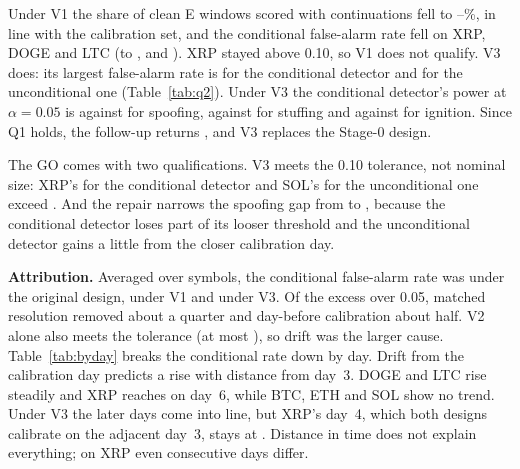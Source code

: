 \documentclass[journal]{IEEEtran}
\begin{document}
Under V1 the share of clean E windows scored with \Mrefine{} continuations fell to
--\%, in line with the calibration set, and the conditional false-alarm rate
fell on XRP, DOGE and LTC (to \faVOneGenXrp, \faVOneGenDoge{} and \faVOneGenLtc). XRP stayed above 0.10, so V1
does not qualify. V3 does: its largest false-alarm rate is \faMaxGenVThree{} for the conditional detector and
\faMaxUncVThree{} for the unconditional one (Table~\ref{tab:q2}). Under V3 the conditional detector's power at
$\alpha=0.05$ is \powVThreeGenSpoof{} against \powVThreeUncSpoof{} for spoofing, \powVThreeGenStuff{} against
\powVThreeUncStuff{} for stuffing and \powVThreeGenIgnit{} against \powVThreeUncIgnit{} for ignition. Since Q1
holds, the follow-up returns \qTwoOutcome{}, and V3 replaces the Stage-0 design.

\begin{table}[t]
\centering
\caption{Follow-up Q2: the largest realised false-alarm rate over the six symbols and power at $\alpha=0.05$
(means over strengths and symbols) under each arm. Underlined: above the 0.10 limit. Bold: the higher power of
the pair.}
\label{tab:q2}
\setlength{\tabcolsep}{3pt}
\resizebox{\columnwidth}{!}{}
\end{table}

The GO comes with two qualifications. V3 meets the 0.10 tolerance, not nominal size: XRP's \faVThreeGenXrp{} for
the conditional detector and SOL's \faVThreeUncSol{} for the unconditional one exceed \faTwoSE. And the repair
narrows the spoofing gap from \gapSpoof{} to \rgapSpoof, because the conditional detector loses part of its
looser threshold and the unconditional detector gains a little from the closer calibration day.

\textbf{Attribution.} Averaged over symbols, the conditional false-alarm rate was \faMeanGenOrig{} under the
original design, \faMeanGenVOne{} under V1 and \faMeanGenVThree{} under V3. Of the excess over 0.05, matched
resolution removed about a quarter and day-before calibration about half. V2 alone also meets the tolerance (at
most \faMaxGenVTwo), so drift was the larger cause. Table~\ref{tab:byday} breaks the conditional rate down by
day. Drift from the calibration day predicts a rise with distance from day~3. DOGE and LTC rise steadily and XRP
reaches \faDayOrigXrpC{} on day~6, while BTC, ETH and SOL show no trend. Under V3 the later days come into line,
but XRP's day~4, which both designs calibrate on the adjacent day~3, stays at \faDayVThreeXrpA. Distance in time
does not explain everything; on XRP even consecutive days differ.
\end{document}
